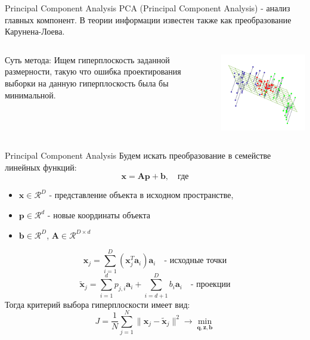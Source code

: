 \documentclass[10pt]{beamer}
\begin{document}
\begin{frame}{Principal Component Analysis}
PCA (Principal Component Analysis) - анализ главных компонент. В теории
информации известен также как преобразование Карунена-Лоева.

\vspace{1em}
\begin{columns}[C]
        \begin{column}{.5\textwidth}
            \begin{block}{Суть метода:}
            Ищем гиперплоскость заданной размерности, такую что ошибка проектирования выборки на данную
            гиперплоскость была бы минимальной.
            \end{block}
        \end{column}
        \begin{column}{.5\textwidth}
        \includegraphics[scale=0.4]{images/projection.png}
        \end{column}
\end{columns}
\end{frame}


\begin{frame}{Principal Component Analysis}
Будем искать преобразование в семействе линейных функций:
\[
    \mathbf{x} = \mathbf{A} \mathbf{p} + \mathbf{b}, \quad \text{где}
\]
\begin{itemize}
    \item $\mathbf{x} \in \mathcal{R}^D$ - представление объекта в исходном
пространстве, 
    \item $\mathbf{p} \in \mathcal{R}^d$ - новые координаты объекта
    \item $\mathbf{b} \in \mathcal{R}^D$, $\mathbf{A} \in \mathcal{R}^{D \times
        d}$
\end{itemize}
\[
    \mathbf{x}_j = \sum \limits _{i=1}^D (\mathbf{x}_j^T \mathbf{a}_i)
    \mathbf{a}_i \quad \text{-  исходные точки}
\]
\[
    \mathbf{\tilde{x}}_j = \sum \limits _{i=1}^d p_{j,i} \mathbf{a}_i + \sum \limits
    _{i=d+1}^D b_i \mathbf{a}_i \quad \text{- проекции}
\]
Тогда критерий выбора гиперплоскости имеет вид:
\[
    J = \frac{1}{N} \sum \limits _{j=1}^N \|\mathbf{x}_j -
    \mathbf{\tilde{x}}_j \|^2 \rightarrow \min \limits _{\mathbf{q},
    \mathbf{z}, \mathbf{b}}
\]
\end{frame}
\end{document}
